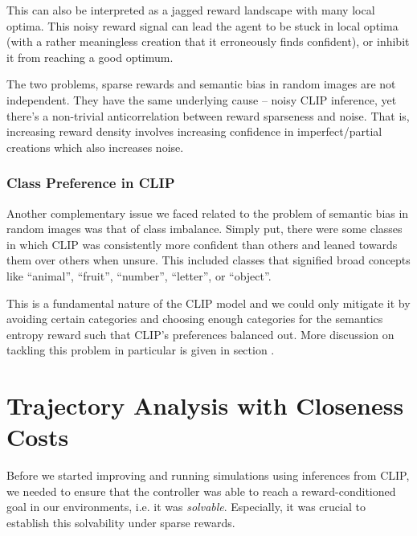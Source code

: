 This can also be interpreted as a jagged reward landscape with many local optima.
This noisy reward signal can lead the agent to be stuck in local optima (with a rather meaningless creation that it erroneously finds confident), or inhibit it from reaching a good optimum.

The two problems, sparse rewards and semantic bias in random images are not independent.
They have the same underlying cause -- noisy CLIP inference, yet there's a non-trivial anticorrelation between reward sparseness and noise.
That is, increasing reward density involves increasing confidence in imperfect/partial creations which also increases noise.


\subsubsection{Class Preference in CLIP}
\label{sec:class-preference}
Another complementary issue we faced related to the problem of semantic bias in random images was that of class imbalance.
Simply put, there were some classes in which CLIP was consistently more confident than others and leaned towards them over others when unsure.
This included classes that signified broad concepts like ``animal'', ``fruit'', ``number'', ``letter'', or ``object''.


This is a fundamental nature of the CLIP model and we could only mitigate it by avoiding certain categories and choosing enough categories for the semantics entropy reward such that CLIP's preferences balanced out.
More discussion on tackling this problem in particular is given in section .


\section{Trajectory Analysis with Closeness Costs}
\label{sec:closeness-rollouts}
Before we started improving and running simulations using inferences from CLIP, we needed to ensure that the controller was able to reach a reward-conditioned goal in our environments, i.e. it was \emph{solvable}.
Especially, it was crucial to establish this solvability under sparse rewards.


